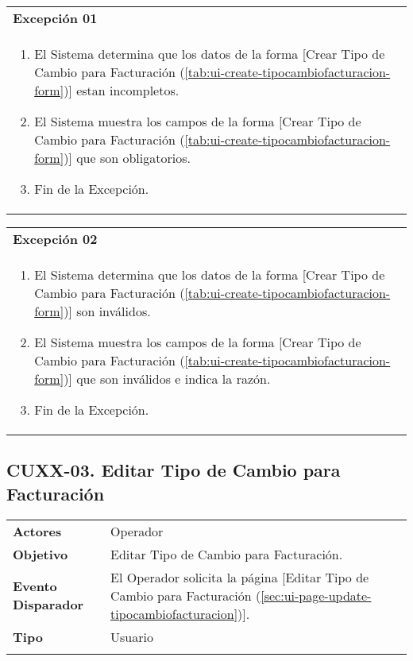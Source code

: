 \begin{tabular}{ p{15.5cm} }
	\textbf{Excepción 01} \\
	\begin{enumerate}
		\item El Sistema determina que los datos de la forma [Crear Tipo de Cambio para Facturación (\ref{tab:ui-create-tipocambiofacturacion-form})] estan incompletos.
		\item El Sistema muestra los campos de la forma [Crear Tipo de Cambio para Facturación (\ref{tab:ui-create-tipocambiofacturacion-form})] que son obligatorios.
		\item Fin de la Excepción.
	\end{enumerate}
\end{tabular}

\begin{tabular}{ p{15.5cm} }
	\textbf{Excepción 02} \\
	\begin{enumerate}
		\item El Sistema determina que los datos de la forma [Crear Tipo de Cambio para Facturación (\ref{tab:ui-create-tipocambiofacturacion-form})] son inválidos.
		\item El Sistema muestra los campos de la forma [Crear Tipo de Cambio para Facturación (\ref{tab:ui-create-tipocambiofacturacion-form})] que son inválidos e indica la razón.
		\item Fin de la Excepción.
	\end{enumerate}
\end{tabular}


\clearpage
\subsection{CUXX-03. Editar Tipo de Cambio para Facturación} \label{sec:cu-update-TipoCambioFacturacion}

\begin{tabular}{ p{3.5cm} p{11.5cm} }
	\textbf{Actores} & Operador\\
	\textbf{Objetivo} & Editar Tipo de Cambio para Facturación.\\
	\textbf{Evento Disparador} & El Operador solicita la página [Editar Tipo de Cambio para Facturación (\ref{sec:ui-page-update-tipocambiofacturacion})].\\
	\textbf{Tipo} & Usuario\\
	\\
\end{tabular}


